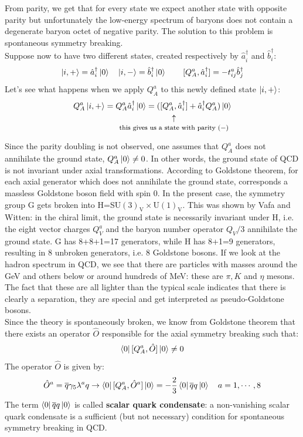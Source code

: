 \documentclass[../main.tex]{subfiles}
\begin{document}
From parity, we get that for every state we expect another state with opposite parity but unfortunately the low-energy spectrum of baryons does not contain a degenerate baryon octet of negative parity. The solution to this problem is spontaneous symmetry breaking.\\
Suppose now to have two different states, created respectively by $\hat{a}_i^\dagger$ and $\hat{b}_i^\dagger$:
\[
\ket{i,+}=\hat{a}_i^\dagger\ket{0} \quad \ket{i,-}=\hat{b}_i^\dagger\ket{0} \qquad [Q_A^a,\hat{a}_i^\dagger]=-t^a_{ij}\hat{b}_j^\dagger
\]
Let's see what happens when we apply $Q_A^a$ to this newly defined state $\ket{i,+}$:
\[
Q_A^a\ket{i,+}=Q_A^a\hat{a}_i^\dagger\ket{0}=(\underset{\mathclap{\tikz \node {$\uparrow$} node [below=1ex] {\footnotesize this gives us a state with parity $(-)$ };}}
{[Q_A^a,\hat{a}_i^\dagger]}+\hat{a}_i^\dagger Q_A^a)\ket{0}
\]
Since the parity doubling is not observed, one assumes that $Q_A^a$ does not annihilate the ground state, $Q_A^a\ket{0}\neq0$. In other words, the ground state of QCD is not invariant under axial transformations. According to Goldstone theorem, for each axial generator which does
not annihilate the ground state, corresponds a massless Goldstone boson field with spin 0. In the present case, the symmetry group G gets broken into H=SU$(3)_{\text{V}}\times$U$(1)_{\text{V}}$. This was shown by Vafa and Witten: in the chiral limit, the ground state is necessarily invariant under H, i.e. the eight vector charges $Q_V^a$ and the baryon number operator $Q_V/3$ annihilate the ground state. G has 8+8+1=17 generators, while H has 8+1=9 generators, resulting in 8 unbroken generators, i.e. 8 Goldstone bosons.
If we look at the hadron spectrum in QCD, we see that there are particles with masses around the GeV and others below or around hundreds of MeV: these are $\pi, K$ and $\eta$ mesons. The fact that these are all lighter than the typical scale indicates that there is clearly a separation, they are special and get interpreted as pseudo-Goldstone bosons.\\
Since the theory is spontaneously broken, we know from Goldstone theorem that there exists an operator $\hat{O}$ responsible for the axial symmetry breaking such that:
\[
\bra{0}[Q_A^a,\hat{O}]\ket{0}\neq0
\]
The operator $\hat{O}$ is given by:
\[
\hat{O}^a=\overline{q}\gamma_5\lambda^a q\to\bra{0}[Q_A^a,\hat{O}^a]\ket{0}=-\frac{2}{3}\bra{0}\overline{q}q\ket{0} \quad a=1,\cdots,8
\]
The term $\bra{0}\overline{q}q\ket{0}$ is called \textbf{scalar quark condensate}: a non-vanishing scalar quark condensate is a sufficient (but not necessary) condition for spontaneous symmetry breaking in QCD.
\end{document}
